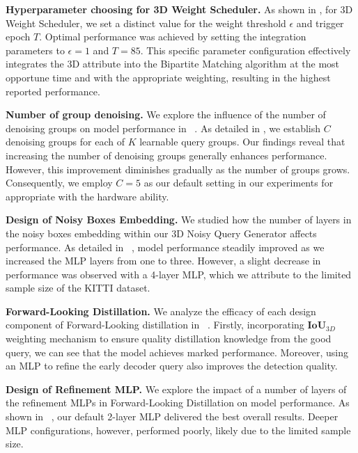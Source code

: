 
\noindent\textbf{Hyperparameter choosing for 3D Weight Scheduler.} As shown in , for 3D Weight Scheduler, we set a distinct value for the weight threshold $\epsilon$ and trigger epoch $T$. Optimal performance was achieved by setting the integration parameters to $\epsilon=1$ and $T=85$. This specific parameter configuration effectively integrates the 3D attribute into the Bipartite Matching algorithm at the most opportune time and with the appropriate weighting, resulting in the highest reported performance.


\noindent\textbf{Number of group denoising.} We explore the influence of the number of denoising groups on model performance in ~. As detailed in , we establish $C$ denoising groups for each of $K$ learnable query groups. Our findings reveal that increasing the number of denoising groups generally enhances performance. However, this improvement diminishes gradually as the number of groups grows. Consequently, we employ $C=5$ as our default setting in our experiments for appropriate with the hardware ability.


\noindent\textbf{Design of Noisy Boxes Embedding.} We studied how the number of layers in the noisy boxes embedding within our 3D Noisy Query Generator affects performance. As detailed in ~, model performance steadily improved as we increased the MLP layers from one to three. However, a slight decrease in performance was observed with a 4-layer MLP, which we attribute to the limited sample size of the KITTI dataset.

\newpage

\noindent\textbf{Forward-Looking Distillation.} We analyze the efficacy of each design component of Forward-Looking distillation in ~. Firstly, incorporating $\mathbf{IoU}_{3D}$ weighting mechanism to ensure quality distillation knowledge from the good query, we can see that the model achieves marked performance. Moreover, using an MLP to refine the early decoder query also improves the detection quality.


\noindent\textbf{Design of Refinement MLP.} We explore the impact of a number of layers of the refinement MLPs in Forward-Looking Distillation on model performance. As shown in ~, our default 2-layer MLP delivered the best overall results. Deeper MLP configurations, however, performed poorly, likely due to the limited sample size.

